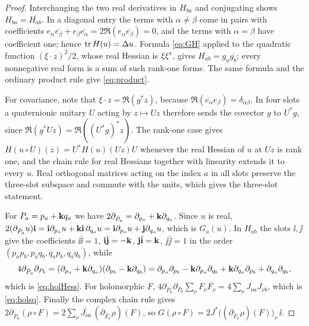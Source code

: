 \begin{proof}
Interchanging the two real derivatives in $H_{ba}$ and conjugating shows $H_{ba}=\overline{H_{ab}}$.
In a diagonal entry the terms with $\alpha\ne\beta$ come in pairs with coefficients
$e_\alpha\overline{e_\beta}+e_\beta\overline{e_\alpha}=2\Re(e_\alpha\overline{e_\beta})=0$, and the
terms with $\alpha=\beta$ have coefficient one; hence $\operatorname{tr} H(u)=\Delta u$. Formula
\eqref{eq:GH} applied to the quadratic function $(\xi\cdot z)^2/2$, whose real Hessian is
$\xi\xi^{\rm t}$, gives $H_{ab}=g_a\overline{g_b}$; every nonnegative real form is a sum of such
rank-one forms. The same formula and the ordinary product rule give \eqref{eq:product}.

For covariance, note that $\xi\cdot z=\Re(g^*z)$, because $\Re(\overline{e_\alpha}e_\beta)=\delta_{\alpha\beta}$.
In four slots a quaternionic unitary $U$ acting by $z\mapsto Uz$ therefore sends the covector
$g$ to $U^*g$, since $\Re(g^*Uz)=\Re((U^*g)^*z)$. The rank-one case gives
$H(u\circ U)(z)=U^*H(u)(Uz)U$ whenever the real Hessian of $u$ at $Uz$ is rank one, and the
chain rule for real Hessians together with linearity extends it to every $u$. Real orthogonal
matrices acting on the index $a$ in all slots preserve the three-slot subspace and commute with
the units, which gives the three-slot statement.

For $P_a=p_a+\mathbf k q_a$ we have $2\partial_{\bar P_a}=\partial_{p_a}+\mathbf k\partial_{q_a}$. Since $u$
is real, $2(\partial_{\bar P_a}u)\mathbf i=\mathbf i\partial_{p_a}u+\mathbf k\mathbf i\,\partial_{q_a}u=
\mathbf i\partial_{p_a}u+\mathbf j\partial_{q_a}u$, which is $G_a(u)$. In $H_{ab}$ the slots $\ii,\jj$ give
the coefficients $\ii\bar\ii=1$, $\mathbf i\bar{\mathbf j}=-\mathbf k$, $\mathbf j\bar{\mathbf i}=\mathbf k$, $\jj\bar\jj=1$ in the order
$(p_ap_b,p_aq_b,q_ap_b,q_aq_b)$, while
\[
4\partial_{\bar P_a}\partial_{P_b}=(\partial_{p_a}+\mathbf k\partial_{q_a})(\partial_{p_b}-\mathbf k\partial_{q_b})
=\partial_{p_a}\partial_{p_b}-\mathbf k\partial_{p_a}\partial_{q_b}+\mathbf k\partial_{q_a}\partial_{p_b}
+\partial_{q_a}\partial_{q_b},
\]
which is \eqref{eq:holHess}. For holomorphic $F$,
$4\partial_{\bar P_a}\partial_{P_b}\sum_\nu F_\nu\overline{F_\nu}=4\sum_\nu\overline{J_{\nu a}}J_{\nu b}$,
which is \eqref{eq:holsq}. Finally the complex chain rule gives
$2\partial_{\bar P_a}(\rho\circ F)=2\sum_\nu\overline{J_{\nu a}}\,(\partial_{\bar F_\nu}\rho)(F)$, so
$G(\rho\circ F)=2J^*\bigl((\partial_{\bar F_\nu}\rho)(F)\bigr)_\nu\,\ii$.
\end{proof}

